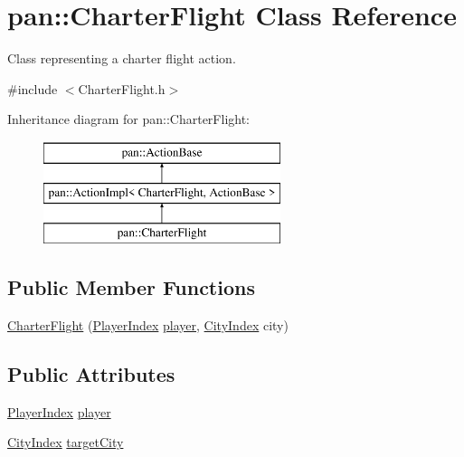 \hypertarget{classpan_1_1_charter_flight}{}\section{pan\+:\+:Charter\+Flight Class Reference}
\label{classpan_1_1_charter_flight}


Class representing a charter flight action.  




{\ttfamily \#include $<$Charter\+Flight.\+h$>$}

Inheritance diagram for pan\+:\+:Charter\+Flight\+:\begin{figure}[H]
\begin{center}
\leavevmode
\includegraphics[height=3.000000cm]{classpan_1_1_charter_flight}
\end{center}
\end{figure}
\subsection*{Public Member Functions}
\begin{DoxyCompactItemize}
\item 
\hyperlink{classpan_1_1_charter_flight_a7e1ae3b2d535c17702106f6bb18d19bc}{Charter\+Flight} (\hyperlink{namespacepan_a0cdabf874fbf1bb3a1f0152d108c2909}{Player\+Index} \hyperlink{classpan_1_1_charter_flight_a36cd9c4ffde7f07b1d187fddc00638d5}{player}, \hyperlink{namespacepan_afaed28aa6603153dcc062a028602d697}{City\+Index} city)
\end{DoxyCompactItemize}
\subsection*{Public Attributes}
\begin{DoxyCompactItemize}
\item 
\hyperlink{namespacepan_a0cdabf874fbf1bb3a1f0152d108c2909}{Player\+Index} \hyperlink{classpan_1_1_charter_flight_a36cd9c4ffde7f07b1d187fddc00638d5}{player}
\item 
\hyperlink{namespacepan_afaed28aa6603153dcc062a028602d697}{City\+Index} \hyperlink{classpan_1_1_charter_flight_a21a435071a78d4a57670fca2f5234b3f}{target\+City}
\end{DoxyCompactItemize}


